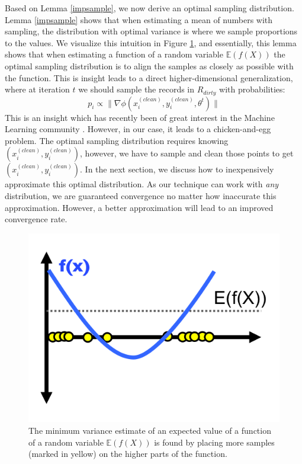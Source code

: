 Based on Lemma \ref{impsample}, we now derive an optimal sampling distribution.
Lemma \ref{impsample} shows that when estimating a mean of numbers with sampling, the distribution with optimal variance is where we sample proportions to the values.
We visualize this intuition in Figure \ref{update-arch3}, and essentially, this lemma shows
that when estimating a function of a random variable $\mathbb{E}(f(X))$ the optimal sampling distribution is to align the samples as closely as possible with the function.
This is insight leads to a direct higher-dimensional generalization, where at iteration $t$ we should sample the records in $R_{dirty}$ with probabilities:
\[
p_i \propto \|\nabla\phi(x^{(clean)}_i,y^{(clean)}_i,\theta^t)\|
\]
This is an insight which has recently been of great interest in the Machine Learning community \cite{zhao2014stochastic}.
However, in our case, it leads to a chicken-and-egg problem.
The optimal sampling distribution requires knowing $(x^{(clean)}_i,y^{(clean)}_i)$, however, we have to sample and clean those points to get $(x^{(clean)}_i,y^{(clean)}_i)$.
In the next section, we discuss how to inexpensively approximate this optimal distribution.
As our technique can work with \emph{any} distribution, we are guaranteed convergence no matter how inaccurate this approximation.
However, a better approximation will lead to an improved convergence rate.

\begin{figure}[ht!]
\centering
 \includegraphics[width=0.6\columnwidth]{figs/update-arch3.png}
 \caption{The minimum variance estimate of an expected value of a function of a random variable $\mathbb{E}(f(X))$ is found by placing more samples (marked in yellow) on the higher parts of the function.\label{update-arch3}}
\end{figure}

